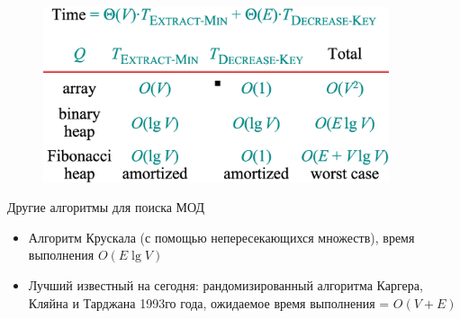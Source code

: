 \documentclass[a4paper,11pt]{article}
\begin{document}
\begin{figure}[ht]
  \centering
  \includegraphics[width=4in]{lecture16/analysis2.eps}
\end{figure}

Другие алгоритмы для поиска МОД

\begin{itemize}
\item Алгоритм Крускала (с помощью непересекающихся множеств), время выполнения $O(E \lg V)$
\item Лучший известный на сегодня: рандомизированный алгоритма Каргера, Кляйна и
  Тарджана 1993го года, ожидаемое время выполнения = $O(V+E)$
  
\end{itemize}
\end{document}
